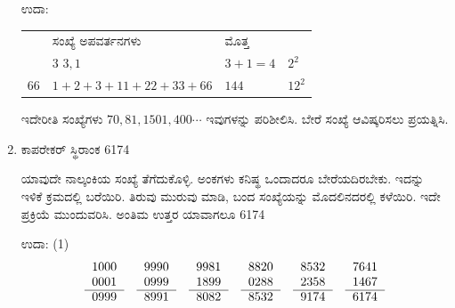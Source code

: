 \begin{enumerate}
ಉದಾ:

\begin{tabular}[t]{llll}
& ಸಂಖ್ಯೆ  \quad ಅಪವರ್ತನಗಳು & ಮೊತ್ತ & \\
 & $3$ \quad\qquad $3, 1$ & $3 + 1 = 4$ & $2^{2}$\\
$66$ & $1+2+3+11+22+33+66$ & $144$ & $12^{2}$
\end{tabular}

\vskip 0.3cm
ಇದೇರೀತಿ ಸಂಖ್ಯೆಗಳು $70, 81, 1501, 400 \cdots$ ಇವುಗಳನ್ನು ಪರಿಶೀಲಿಸಿ. ಬೇರೆ ಸಂಖ್ಯೆ ಆವಿಷ್ಕರಿಸಲು ಪ್ರಯತ್ನಿಸಿ. 

\item ಕಾಪರೇಕರ್ ಸ್ಥಿರಾಂಕ 6174

ಯಾವುದೇ ನಾಲ್ಕಂಕಿಯ ಸಂಖ್ಯೆ ತೆಗೆದುಕೊಳ್ಳಿ. ಅಂಕಗಳು ಕನಿಷ್ಥ ಒಂದಾದರೂ ಬೇರೆಯದಿರಬೇಕು. ಇದನ್ನು ಇಳಿಕೆ ಕ್ರಮದಲ್ಲಿ ಬರೆಯಿರಿ. ತಿರುವು ಮುರುವು ಮಾಡಿ, ಬಂದ ಸಂಖ್ಯೆಯನ್ನು ಮೊದಲಿನದರಲ್ಲಿ ಕಳೆಯಿರಿ. ಇದೇ ಪ್ರಕ್ರಿಯೆ ಮುಂದುವರಿಸಿ. ಅಂತಿಮ ಉತ್ತರ ಯಾವಾಗಲೂ 6174

ಉದಾ: (1)
\begin{equation*}
\begin{tabular}[t]{r}
1000 \\
0001\\\cline{1-1} 
0999
\end{tabular}
\quad
\begin{tabular}[t]{r}
9990\\ 
0999\\\cline{1-1} 
8991
\end{tabular}
\quad
\begin{tabular}[t]{r}
9981\\ 
1899\\\cline{1-1} 
8082
\end{tabular}
\quad
\begin{tabular}[t]{r}
8820\\ 
0288\\\cline{1-1} 
8532
\end{tabular}
\quad
\begin{tabular}[t]{r}
8532\\ 
2358\\\cline{1-1} 
9174
\end{tabular}
\quad
\begin{tabular}[t]{r}
7641\\ 
1467\\\cline{1-1} 
6174
\end{tabular}
\end{equation*}


\end{enumerate}
